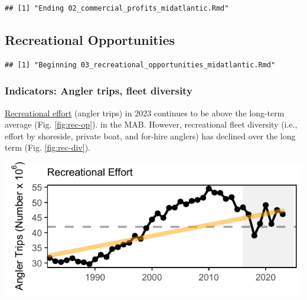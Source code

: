 \documentclass[
  10pt,
]{article}
\let\origfigure\figure
\let\endorigfigure\endfigure
\renewenvironment{figure}[1][2] {
    \expandafter\origfigure\expandafter[H]
} {
    \endorigfigure
}
\begin{document}
\begin{verbatim}
## [1] "Ending 02_commercial_profits_midatlantic.Rmd"
\end{verbatim}

\subsection{Recreational Opportunities}\label{recreational-opportunities}

\begin{verbatim}
## [1] "Beginning 03_recreational_opportunities_midatlantic.Rmd"
\end{verbatim}

\subsubsection{Indicators: Angler trips, fleet diversity}\label{indicators-angler-trips-fleet-diversity}

\href{https://noaa-edab.github.io/catalog/recdat.html}{Recreational effort} (angler trips) in 2023 continues to be above the long-term average (Fig. \ref{fig:rec-op}). in the MAB. However, recreational fleet diversity (i.e., effort by shoreside, private boat, and for-hire anglers) has declined over the long term (Fig. \ref{fig:rec-div}).

\begin{figure}

{\centering \includegraphics{midatlantic_files/figure-latex/rec-op-1} 

}

\caption{Recreational effort (number of trips, black) in the Mid-Atlantic, with significant increase (orange line).}\label{fig:rec-op}
\end{figure}
\end{document}
